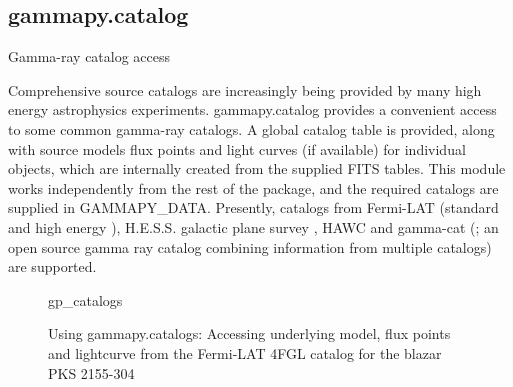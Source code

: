 \subsection{gammapy.catalog}
\label{ssec:gammapy-catalog}
Gamma-ray catalog access

Comprehensive source catalogs are increasingly being provided by many high energy astrophysics experiments. gammapy.catalog provides a convenient access to some common gamma-ray catalogs. A global catalog table is provided, along with source models flux points and light curves (if available) for individual objects, which are internally created from the supplied FITS tables. This module works independently from the rest of the package, and the required catalogs are supplied in GAMMAPY\_DATA. Presently, catalogs from Fermi-LAT (standard \citep{3FGL, 4FGL} and high energy \citep{2FHL, 3FHL}), H.E.S.S. galactic plane survey \citep{HGPS}, HAWC \citep{2HWC, 3HWC} and gamma-cat (\citep{gamma-cat}; an open source gamma ray catalog combining information from multiple catalogs) are supported. 

\begin{figure}
	{gp_catalogs}
	\caption{Using gammapy.catalogs: Accessing underlying model, flux points and lightcurve from the Fermi-LAT 4FGL catalog for the blazar PKS 2155-304}
	\label{codeexample:data}
\end{figure}
